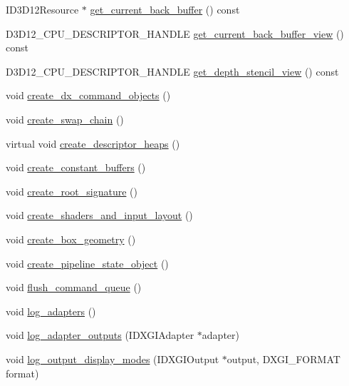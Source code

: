 \begin{DoxyCompactItemize}
\item 
I\+D3\+D12\+Resource $\ast$ \hyperlink{class_direct_x_renderer_a94f4585e3451924820e261e01d8cfc89_a94f4585e3451924820e261e01d8cfc89}{get\+\_\+current\+\_\+back\+\_\+buffer} () const 
\item 
D3\+D12\+\_\+\+C\+P\+U\+\_\+\+D\+E\+S\+C\+R\+I\+P\+T\+O\+R\+\_\+\+H\+A\+N\+D\+LE \hyperlink{class_direct_x_renderer_a7bfc3b725a9ecb5e47889f0e9627f0c8_a7bfc3b725a9ecb5e47889f0e9627f0c8}{get\+\_\+current\+\_\+back\+\_\+buffer\+\_\+view} () const 
\item 
D3\+D12\+\_\+\+C\+P\+U\+\_\+\+D\+E\+S\+C\+R\+I\+P\+T\+O\+R\+\_\+\+H\+A\+N\+D\+LE \hyperlink{class_direct_x_renderer_a3fd16381af742f128d5a7138d65be695_a3fd16381af742f128d5a7138d65be695}{get\+\_\+depth\+\_\+stencil\+\_\+view} () const 
\item 
void \hyperlink{class_direct_x_renderer_aef2318aa9f9757fde25c94c9857143e8_aef2318aa9f9757fde25c94c9857143e8}{create\+\_\+dx\+\_\+command\+\_\+objects} ()
\item 
void \hyperlink{class_direct_x_renderer_ab76ef034cbf3cfafc7a8aae1b50f6e6b_ab76ef034cbf3cfafc7a8aae1b50f6e6b}{create\+\_\+swap\+\_\+chain} ()
\item 
virtual void \hyperlink{class_direct_x_renderer_a0f9a3dabe2f03739ba06155572eef957_a0f9a3dabe2f03739ba06155572eef957}{create\+\_\+descriptor\+\_\+heaps} ()
\item 
void \hyperlink{class_direct_x_renderer_a09278f83b0f7f134871bb21c72e07587_a09278f83b0f7f134871bb21c72e07587}{create\+\_\+constant\+\_\+buffers} ()
\item 
void \hyperlink{class_direct_x_renderer_acaec9787ee504297135360aaf1bf45fa_acaec9787ee504297135360aaf1bf45fa}{create\+\_\+root\+\_\+signature} ()
\item 
void \hyperlink{class_direct_x_renderer_a83af308560d21041e34b96f35ba0b9d9_a83af308560d21041e34b96f35ba0b9d9}{create\+\_\+shaders\+\_\+and\+\_\+input\+\_\+layout} ()
\item 
void \hyperlink{class_direct_x_renderer_ab236cfa51aff8ae36741f94ae4abf167_ab236cfa51aff8ae36741f94ae4abf167}{create\+\_\+box\+\_\+geometry} ()
\item 
void \hyperlink{class_direct_x_renderer_a7626b1775267e151905115055e0bbc7f_a7626b1775267e151905115055e0bbc7f}{create\+\_\+pipeline\+\_\+state\+\_\+object} ()
\item 
void \hyperlink{class_direct_x_renderer_ab1ac2acccb63781ec8ccce58fe351c63_ab1ac2acccb63781ec8ccce58fe351c63}{flush\+\_\+command\+\_\+queue} ()
\item 
void \hyperlink{class_direct_x_renderer_a8bf63477a5f9f210b627c2d07d54caa5_a8bf63477a5f9f210b627c2d07d54caa5}{log\+\_\+adapters} ()
\item 
void \hyperlink{class_direct_x_renderer_a13dbd659f5d0a72be90b0a4be1121ef8_a13dbd659f5d0a72be90b0a4be1121ef8}{log\+\_\+adapter\+\_\+outputs} (I\+D\+X\+G\+I\+Adapter $\ast$adapter)
\item 
void \hyperlink{class_direct_x_renderer_ac2a94e66b56fa26905f19f6952f9dc28_ac2a94e66b56fa26905f19f6952f9dc28}{log\+\_\+output\+\_\+display\+\_\+modes} (I\+D\+X\+G\+I\+Output $\ast$output, D\+X\+G\+I\+\_\+\+F\+O\+R\+M\+AT format)
\end{DoxyCompactItemize}
